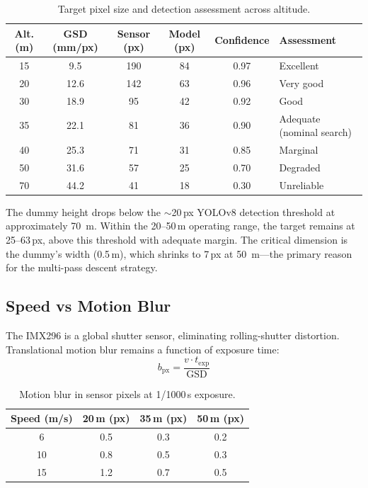 \documentclass[10pt,a4paper]{article}
\begin{document}
\begin{table}[ht]
  \centering
  \caption{Target pixel size and detection assessment across altitude.}\label{tab:px-by-alt}
  \begin{tabular}{@{}c c c c c l@{}}
    \toprule
    \textbf{Alt. (m)} & \textbf{GSD (mm/px)} & \textbf{Sensor (px)} & \textbf{Model (px)} & \textbf{Confidence} & \textbf{Assessment} \\
    \midrule
    15  & 9.5  & 190 & 84  & 0.97 & Excellent \\
    20  & 12.6 & 142 & 63  & 0.96 & Very good \\
    30  & 18.9 & 95  & 42  & 0.92 & Good \\
    35  & 22.1 & 81  & 36  & 0.90 & Adequate (nominal search) \\
    40  & 25.3 & 71  & 31  & 0.85 & Marginal \\
    50  & 31.6 & 57  & 25  & 0.70 & Degraded \\
    70  & 44.2 & 41  & 18  & 0.30 & Unreliable \\
    \bottomrule
  \end{tabular}
\end{table}

The dummy height drops below the ${\sim}$20\,px YOLOv8 detection threshold at approximately \SI{70}{\metre}. Within the 20--50\,m operating range, the target remains at 25--63\,px, above this threshold with adequate margin. The critical dimension is the dummy's width (0.5\,m), which shrinks to 7\,px at \SI{50}{\metre}---the primary reason for the multi-pass descent strategy.

\subsection{Speed vs Motion Blur}

The IMX296 is a global shutter sensor, eliminating rolling-shutter distortion. Translational motion blur remains a function of exposure time:
\begin{equation}\label{eq:blur}
  b_{\mathrm{px}} = \frac{v \cdot t_{\mathrm{exp}}}{\mathrm{GSD}}
\end{equation}

\begin{table}[ht]
  \centering
  \caption{Motion blur in sensor pixels at 1/1000\,s exposure.}\label{tab:blur}
  \begin{tabular}{@{}c c c c@{}}
    \toprule
    \textbf{Speed (m/s)} & \textbf{20\,m (px)} & \textbf{35\,m (px)} & \textbf{50\,m (px)} \\
    \midrule
     6 & 0.5 & 0.3 & 0.2 \\
    10 & 0.8 & 0.5 & 0.3 \\
    15 & 1.2 & 0.7 & 0.5 \\
    \bottomrule
  \end{tabular}
\end{table}
\end{document}
